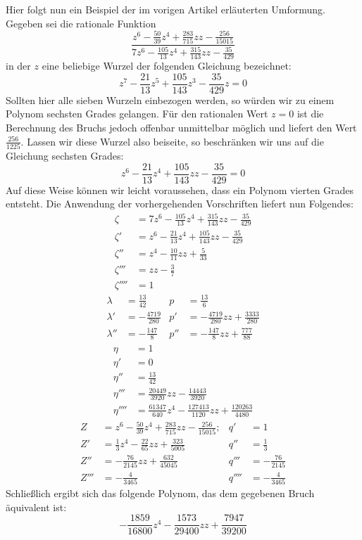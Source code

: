 Hier folgt nun ein Beispiel der im vorigen Artikel erläuterten Umformung. Gegeben sei die rationale Funktion
\[
\frac{z^6-\frac{50}{39}z^4+\frac{283}{715}zz-\frac{256}{15015}}{7z^6-\frac{105}{13}z^4+\frac{315}{143}zz-\frac{35}{429}}
\]
in der $z$ eine beliebige Wurzel der folgenden Gleichung bezeichnet:
\[
z^7-\frac{21}{13}z^5+\frac{105}{143}z^3-\frac{35}{429}z=0
\]
Sollten hier alle sieben Wurzeln einbezogen werden, so würden wir zu einem Polynom sechsten Grades gelangen. Für den rationalen Wert $z=0$ ist die Berechnung des Bruchs jedoch offenbar unmittelbar möglich und liefert den Wert $\frac{256}{1225}$. Lassen wir diese Wurzel also beiseite, so beschränken wir uns auf die Gleichung sechsten Grades:
\[
z^6-\frac{21}{13}z^4+\frac{105}{143}zz-\frac{35}{429}=0
\]
Auf diese Weise können wir leicht voraussehen, dass ein Polynom vierten Grades entsteht. Die Anwendung der vorhergehenden Vorschriften liefert nun Folgendes:
\[
\begin{aligned}
\zeta&=7z^6-\frac{105}{13}z^4+\frac{315}{143}zz-\frac{35}{429}\\[5pt]
\zeta'&=z^6-\frac{21}{13}z^4+\frac{105}{143}zz-\frac{35}{429}\\[5pt]
\zeta''&=z^4-\frac{10}{11}zz+\frac{5}{33}\\[5pt]
\zeta'''&=zz-\frac{3}{7}\\[5pt]
\zeta''''&=1
\end{aligned}\]
\[\begin{aligned}
\lambda&=\frac{13}{42}&p&=\frac{13}{6}\\[5pt]
\lambda'&=-\frac{4719}{280}&p'&=-\frac{4719}{280}zz+\frac{3333}{280}\\[5pt]
\lambda''&=-\frac{147}{8}&p''&=-\frac{147}{8}zz+\frac{777}{88}
\end{aligned}\]
\[\begin{aligned}
\eta&=1\\[5pt]
\eta'&=0\\[5pt]
\eta''&=\frac{13}{42}\\[5pt]
\eta'''&=\frac{20449}{3920}zz-\frac{14443}{3920}\\[5pt]
\eta''''&=\frac{61347}{640}z^4-\frac{127413}{1120}zz+\frac{120263}{4480}
\end{aligned}\]
\[\begin{aligned}
Z&=z^6-\frac{50}{39}z^4+\frac{283}{715}zz-\frac{256}{15015};&q'&=1\\[5pt]
Z'&=\frac{1}{3}z^4-\frac{22}{65}zz+\frac{323}{5005}&q''&=\frac{1}{3}\\[5pt]
Z''&=-\frac{76}{2145}zz+\frac{632}{45045}&q'''&=-\frac{76}{2145}\\[5pt]
Z'''&=-\frac{4}{3465}&q''''&=-\frac{4}{3465}
\end{aligned}
\]
Schließlich ergibt sich das folgende Polynom, das dem gegebenen Bruch äquivalent ist:
\[
-\frac{1859}{16800}z^4-\frac{1573}{29400}zz+\frac{7947}{39200}
\]

